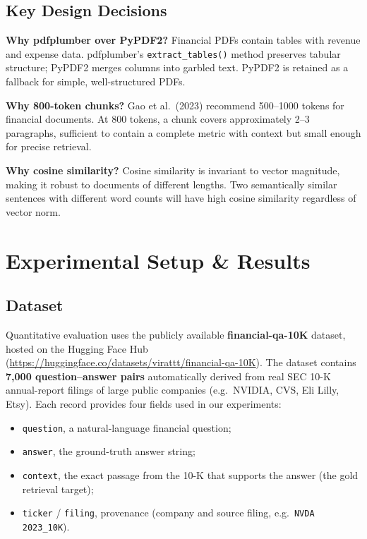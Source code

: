 \documentclass[12pt,a4paper]{article}
\begin{document}
\subsection{Key Design Decisions}

\textbf{Why pdfplumber over PyPDF2?}
Financial PDFs contain tables with revenue and expense data. pdfplumber's \texttt{extract\_tables()} method preserves tabular structure; PyPDF2 merges columns into garbled text. PyPDF2 is retained as a fallback for simple, well-structured PDFs.

\textbf{Why 800-token chunks?}
Gao et al.\ (2023) recommend 500--1000 tokens for financial documents. At 800 tokens, a chunk covers approximately 2--3 paragraphs, sufficient to contain a complete metric with context but small enough for precise retrieval.

\textbf{Why cosine similarity?}
Cosine similarity is invariant to vector magnitude, making it robust to documents of different lengths. Two semantically similar sentences with different word counts will have high cosine similarity regardless of vector norm.

\section{Experimental Setup \& Results}

\subsection{Dataset}

Quantitative evaluation uses the publicly available \textbf{financial-qa-10K} dataset, hosted on the Hugging Face Hub (\url{https://huggingface.co/datasets/virattt/financial-qa-10K}). The dataset contains \textbf{7{,}000 question--answer pairs} automatically derived from real SEC 10-K annual-report filings of large public companies (e.g.\ NVIDIA, CVS, Eli Lilly, Etsy). Each record provides four fields used in our experiments:

\begin{itemize}[noitemsep]
  \item \texttt{question}, a natural-language financial question;
  \item \texttt{answer}, the ground-truth answer string;
  \item \texttt{context}, the exact passage from the 10-K that supports the answer (the gold retrieval target);
  \item \texttt{ticker} / \texttt{filing}, provenance (company and source filing, e.g.\ \texttt{NVDA 2023\_10K}).
\end{itemize}
\end{document}
